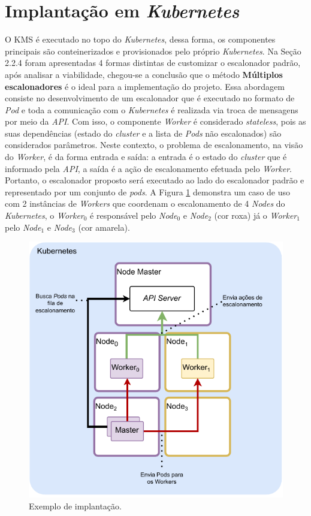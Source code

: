 \section{Implantação em \textit{Kubernetes}}
O \ac{KMS} é executado no topo do \textit{Kubernetes}, dessa forma, os componentes principais são conteinerizados e provisionados pelo próprio \textit{Kubernetes}. Na Seção 2.2.4 foram apresentadas 4 formas distintas de customizar o escalonador padrão, após analisar a viabilidade, chegou-se a conclusão que o método \textbf{Múltiplos escalonadores} é o ideal para a implementação do projeto. Essa abordagem consiste no desenvolvimento de um escalonador que é executado no formato de \textit{Pod} e toda a comunicação com o \textit{Kubernetes} é realizada via troca de mensagens por meio da \textit{API}. Com isso, o componente \textit{Worker} é considerado \textit{stateless}, pois as suas dependências (estado do \textit{cluster} e a lista de \textit{Pods} não escalonados) são considerados parâmetros. Neste contexto, o problema de escalonamento, na visão do \textit{Worker}, é da forma entrada e saída: a entrada é o estado do \textit{cluster} que é informado pela \textit{API}, a saída é a ação de escalonamento efetuada pelo \textit{Worker}. Portanto, o escalonador proposto será executado ao lado do escalonador padrão e representado por um conjunto de \textit{pods}. A Figura \ref{fig:proposta_kubernetes} demonstra um caso de uso com 2 instâncias de \textit{Workers} que coordenam o escalonamento de 4 \textit{Nodes} do \textit{Kubernetes}, o \textit{Worker$_0$} é responsável pelo \textit{Node$_0$} e \textit{Node$_2$} (cor roxa) já o \textit{Worker$_1$} pelo \textit{Node$_1$} e \textit{Node$_3$} (cor amarela).

\begin{figure}[h!]
	\caption{\label{fig:proposta_kubernetes}Exemplo de implantação.}
	\centering
	\includegraphics[width=.7\linewidth]{assets/arquitetura-worker.pdf}
\end{figure}

